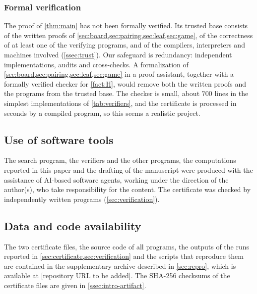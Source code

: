 \subsubsection*{Formal verification}
The proof of \cref{thm:main} has not been formally verified. Its trusted base consists of the written
proofs of \cref{sec:board,sec:pairing,sec:leaf,sec:game}, of the correctness of at least one of the
verifying programs, and of the compilers, interpreters and machines involved (\cref{ssec:trust}). Our
safeguard is redundancy: independent implementations, audits and cross-checks. A formalization of
\cref{sec:board,sec:pairing,sec:leaf,sec:game} in a proof assistant, together with a formally verified
checker for \cref{fact:H}, would remove both the written proofs and the programs from the trusted base.
The checker is small, about $700$ lines in the simplest implementations of \cref{tab:verifiers}, and
the certificate is processed in seconds by a compiled program, so this seems a realistic project.

\subsection*{Use of software tools}
The search program, the verifiers and the other programs, the computations reported in this paper and
the drafting of the manuscript were produced with the assistance of AI-based software agents, working
under the direction of the author(s), who take responsibility for the content. The certificate was
checked by independently written programs (\cref{sec:verification}).

\subsection*{Data and code availability}
The two certificate files, the source code of all programs, the outputs of the runs reported in
\cref{sec:certificate,sec:verification} and the scripts that reproduce them are contained in the
supplementary archive described in \cref{sec:repro}, which is available at [repository URL to be
added]. The SHA-256 checksums of the certificate files are given in \cref{ssec:intro-artifact}.

